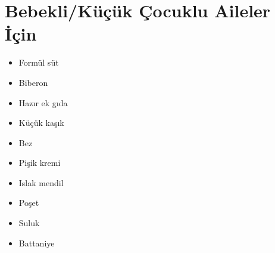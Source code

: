 \chapter*{Bebekli/Küçük Çocuklu Aileler İçin}

\begin{itemize}
	\item Formül süt
	\item Biberon
	\item Hazır ek gıda
	\item Küçük kaşık
	\item Bez
	\item Pişik kremi
	\item Islak mendil
	\item Poşet
	\item Suluk
	\item Battaniye
\end{itemize}